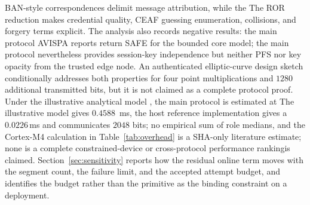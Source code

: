 \documentclass[cmc,article,submit,moreauthors,pdftex]{Definitions/tsp}
\providecommand{\DIFadd}[1]{{\protect\color{blue} \sf #1}} %
\providecommand{\DIFdel}[1]{{\protect\color{red} \scriptsize #1}} %
\providecommand{\DIFaddbegin}{} %
\providecommand{\DIFaddend}{} %
\providecommand{\DIFdelbegin}{} %
\providecommand{\DIFdelend}{} %
\begin{document}
\DIFdelbegin \DIFdel{BAN-style correspondences delimit message attribution, while the }\DIFdelend \DIFaddbegin \DIFadd{The }\DIFaddend ROR reduction makes credential quality, CEAF \DIFdelbegin \DIFdel{guessing}\DIFdelend \DIFaddbegin \DIFadd{enumeration}\DIFaddend , collisions, and forgery terms explicit. The \DIFdelbegin \DIFdel{analysis also records negative results: the main protocol }\DIFdelend \DIFaddbegin \DIFadd{AVISPA reports return SAFE for the bounded core model; the main protocol nevertheless }\DIFaddend provides session-key independence but neither PFS nor key opacity from the trusted edge node. \DIFdelbegin \DIFdel{An authenticated elliptic-curve design sketch conditionally addresses both properties for four point multiplications and $1280$ additional transmitted bits, but it is not claimed as a complete protocol proof. Under the illustrative analytical model , the main protocol is estimated at }\DIFdelend \DIFaddbegin \DIFadd{The illustrative model gives }\DIFaddend $0.4588$\,\DIFaddbegin \DIFadd{ms, the host reference implementation gives a $0.0226$\,}\DIFaddend ms \DIFdelbegin \DIFdel{and communicates $2048$ bits; no empirical }\DIFdelend \DIFaddbegin \DIFadd{sum of role medians, and the Cortex-M4 calculation in Table~\ref{tab:overhead} is a SHA-only literature estimate; none is a complete constrained-device }\DIFaddend or cross-protocol \DIFdelbegin \DIFdel{performance rankingis claimed. Section~\ref{sec:sensitivity} reports how the residual online term moves with the segment count, the failure limit, and the accepted attempt budget, and identifies the budget rather than the primitive as the binding constraint on a deployment.
}%
\end{document}
